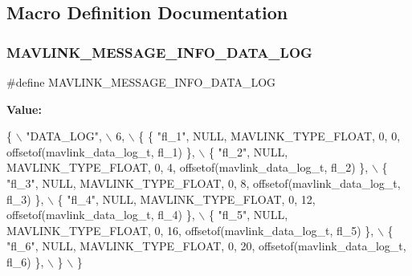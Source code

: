\subsection{Macro Definition Documentation}
\mbox{\label{mavlink__msg__data__log_8h_a2af7ada461915a485fc2c770bb644bba}} 
\subsubsection{M\+A\+V\+L\+I\+N\+K\+\_\+\+M\+E\+S\+S\+A\+G\+E\+\_\+\+I\+N\+F\+O\+\_\+\+D\+A\+T\+A\+\_\+\+L\+OG}
{\footnotesize\ttfamily \#define M\+A\+V\+L\+I\+N\+K\+\_\+\+M\+E\+S\+S\+A\+G\+E\+\_\+\+I\+N\+F\+O\+\_\+\+D\+A\+T\+A\+\_\+\+L\+OG}

{\bfseries Value\+:}
\begin{DoxyCode}
\{ \(\backslash\)
    \textcolor{stringliteral}{"DATA\_LOG"}, \(\backslash\)
    6, \(\backslash\)
    \{  \{ \textcolor{stringliteral}{"fl\_1"}, NULL, MAVLINK_TYPE_FLOAT, 0, 0, offsetof(mavlink_data_log_t, fl\_1) \}, \(\backslash\)
         \{ \textcolor{stringliteral}{"fl\_2"}, NULL, MAVLINK_TYPE_FLOAT, 0, 4, offsetof(mavlink_data_log_t, fl\_2) \}, \(\backslash\)
         \{ \textcolor{stringliteral}{"fl\_3"}, NULL, MAVLINK_TYPE_FLOAT, 0, 8, offsetof(mavlink_data_log_t, fl\_3) \}, \(\backslash\)
         \{ \textcolor{stringliteral}{"fl\_4"}, NULL, MAVLINK_TYPE_FLOAT, 0, 12, offsetof(mavlink_data_log_t, fl\_4) \}, \(\backslash\)
         \{ \textcolor{stringliteral}{"fl\_5"}, NULL, MAVLINK_TYPE_FLOAT, 0, 16, offsetof(mavlink_data_log_t, fl\_5) \}, \(\backslash\)
         \{ \textcolor{stringliteral}{"fl\_6"}, NULL, MAVLINK_TYPE_FLOAT, 0, 20, offsetof(mavlink_data_log_t, fl\_6) \}, \(\backslash\)
         \} \(\backslash\)
\}
\end{DoxyCode}
\mbox{\label{mavlink__msg__data__log_8h_aea56d20f82a175d19fe751b7da5ac99f}} 
